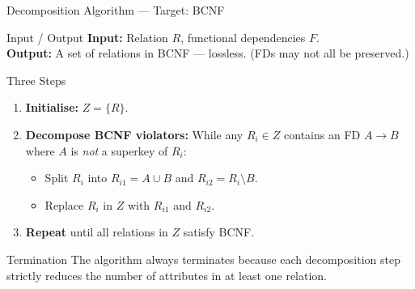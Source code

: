 \begin{frame}{Decomposition Algorithm --- Target: BCNF}
  \begin{block}{Input / Output}
    \textbf{Input:} Relation $R$, functional dependencies $F$.\\
    \textbf{Output:} A set of relations in BCNF --- lossless.
    (FDs may not all be preserved.)
  \end{block}

  \begin{block}{Three Steps}
    \begin{enumerate}
      \item \textbf{Initialise:} $Z = \{R\}$.
      \item \textbf{Decompose BCNF violators:} While any $R_i \in Z$ contains
            an FD $A \to B$ where $A$ is \emph{not} a superkey of $R_i$:
            \begin{itemize}
              \item Split $R_i$ into $R_{i1} = A \cup B$ and
                    $R_{i2} = R_i \setminus B$.
              \item Replace $R_i$ in $Z$ with $R_{i1}$ and $R_{i2}$.
            \end{itemize}
      \item \textbf{Repeat} until all relations in $Z$ satisfy BCNF.
    \end{enumerate}
  \end{block}

  \begin{alertblock}{Termination}
    The algorithm always terminates because each decomposition step strictly
    reduces the number of attributes in at least one relation.
  \end{alertblock}
\end{frame}

